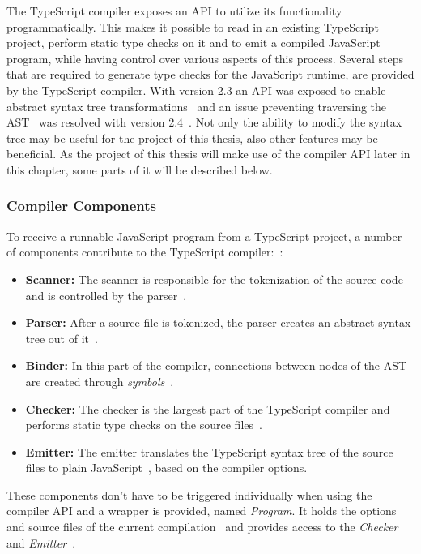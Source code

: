 The TypeScript compiler exposes an API to utilize its functionality programmatically. This makes it possible to read in an existing TypeScript project, perform static type checks on it and to emit a compiled JavaScript program, while having control over various aspects of this process. Several steps that are required to generate type checks for the JavaScript runtime, are provided by the TypeScript compiler. With version 2.3 an API was exposed to enable abstract syntax tree transformations~\cite{TypeScriptPullRequest:Transformation} and an issue preventing traversing the AST~\cite{TypeScriptIssue:Visitors} was resolved with version 2.4~\cite{TypeScriptPullRequest:Visitors}. Not only the ability to modify the syntax tree may be useful for the project of this thesis, also other features may be beneficial. As the project of this thesis will make use of the compiler API later in this chapter, some parts of it will be described below.

\subsubsection{Compiler Components}

To receive a runnable JavaScript program from a TypeScript project, a number of components contribute to the TypeScript compiler:~\cite[p.~251]{TypeScriptBook:Syed:2017}:
\begin{itemize}
  \item \textbf{Scanner:} The scanner is responsible for the tokenization of the source code and is controlled by the parser~\cite[p.~260]{TypeScriptBook:Syed:2017}.
  \item \textbf{Parser:} After a source file is tokenized, the parser creates an abstract syntax tree out of it~\cite[p.~263]{TypeScriptBook:Syed:2017}.
  \item \textbf{Binder:} In this part of the compiler, connections between nodes of the AST are created through \emph{symbols}~\cite[p.~267]{TypeScriptBook:Syed:2017}.
  \item \textbf{Checker:} The checker is the largest part of the TypeScript compiler and performs static type checks on the source files~\cite[p.~282]{TypeScriptBook:Syed:2017}.
  \item \textbf{Emitter:} The emitter translates the TypeScript syntax tree of the source files to plain JavaScript~\cite[p.~286]{TypeScriptBook:Syed:2017}, based on the compiler options.
\end{itemize}
These components don't have to be triggered individually when using the compiler API and a wrapper is provided, named \emph{Program}. It holds the options and source files of the current compilation~\cite[p.~254]{TypeScriptBook:Syed:2017} and provides access to the \emph{Checker}~\cite[p.~282]{TypeScriptBook:Syed:2017} and \emph{Emitter}~\cite[p.~286]{TypeScriptBook:Syed:2017}.

